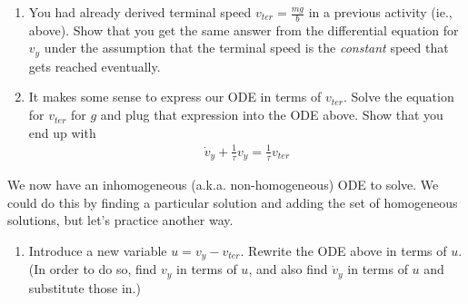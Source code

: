 \documentclass[12pt]{article}
\begin{document}
\begin{enumerate}
\begin{enumerate}

          \item You had already derived terminal speed $v_{ter} = \frac{mg}{b}$ in a previous activity (ie., above). Show that you get the same answer from the differential equation for $v_y$ under the assumption that the terminal speed is the \textit{constant} speed that gets reached eventually.


          \item It makes some sense to express our ODE in terms of $v_{ter}$. Solve the equation for $v_{ter}$ for $g$ and plug that expression into the ODE above. Show that you end up with
                \begin{align}
                  \dot v_y + \frac{1}{\tau} v_y = \frac{1}{\tau} v_{ter}
                \end{align}

        \end{enumerate}

        We now have an inhomogeneous (a.k.a. non-homogeneous) ODE to solve. We could do this by finding a particular solution and adding the set of homogeneous solutions, but let's practice another way.

        \begin{enumerate}[resume]

          \item Introduce a new variable $u = v_y - v_{ter}$. Rewrite the ODE above in terms of $u$. (In order to do so, find $v_y$ in terms of $u$, and also find $\dot v_y$ in terms of $u$ and substitute those in.)


\end{enumerate}
\end{enumerate}
\end{document}
